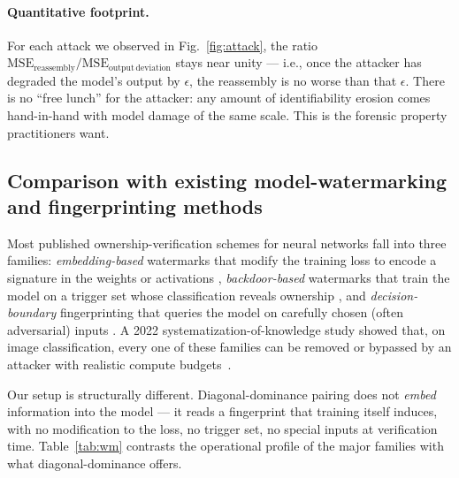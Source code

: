 \documentclass[10pt]{article}
\theoremstyle{remark}
\begin{document}
\paragraph{Quantitative footprint.} For each attack we observed in
Fig.~\ref{fig:attack}, the ratio
$\mathrm{MSE_{reassembly}} / \mathrm{MSE_{output\,deviation}}$ stays
near unity --- i.e., once the attacker has degraded the model's
output by $\epsilon$, the reassembly is no worse than that
$\epsilon$. There is no ``free lunch'' for the attacker: any amount
of identifiability erosion comes hand-in-hand with model damage of
the same scale. This is the forensic property practitioners want.

\subsection{Comparison with existing model-watermarking and
fingerprinting methods}\label{sec:watermark-compare}

Most published ownership-verification schemes for neural networks fall
into three families: \emph{embedding-based} watermarks that modify the
training loss to encode a signature in the weights or activations
\cite{uchida2017embedding,rouhani2019deepsigns,chen2019deepmarks},
\emph{backdoor-based} watermarks that train the model on a trigger set
whose classification reveals ownership
\cite{adi2018turning,zhang2018protecting}, and
\emph{decision-boundary} fingerprinting that queries the model on
carefully chosen (often adversarial) inputs
\cite{lemerrer2020adversarial,cao2021ipguard,he2019sensitive}. A 2022
systematization-of-knowledge study showed that, on image
classification, every one of these families can be removed or bypassed
by an attacker with realistic compute budgets~\cite{lukas2022deep}.

Our setup is structurally different. Diagonal-dominance pairing does
not \emph{embed} information into the model --- it reads a fingerprint
that training itself induces, with no modification to the loss, no
trigger set, no special inputs at verification time. Table~\ref{tab:wm}
contrasts the operational profile of the major families with what
diagonal-dominance offers.
\end{document}
